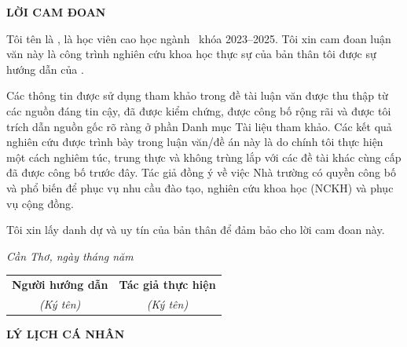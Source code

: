 
\newpage

\begin{center}
		\vspace*{50pt} %
	{\fontsize{14}{0pt}\selectfont\bf LỜI CAM ĐOAN}
\end{center}
\vspace{20pt}

Tôi tên là \student, là học viên cao học ngành \major\, khóa 2023--2025. Tôi xin cam đoan luận văn này là công trình
nghiên cứu khoa học thực sự của bản thân tôi được sự hướng dẫn của \MainAdvisor.

Các thông tin được sử dụng tham khảo trong đề tài luận văn được thu thập từ các nguồn đáng tin cậy, đã được kiểm chứng, được công bố rộng rãi và được tôi trích dẫn nguồn	gốc rõ ràng ở phần Danh mục Tài liệu tham khảo. Các kết quả nghiên cứu được trình bày trong luận văn/đề án này là do chính tôi thực hiện một cách nghiêm túc, trung thực và không trùng lắp với các đề tài khác cùng cấp đã được công bố trước đây. Tác giả đồng ý về việc Nhà trường có quyền công bố và phổ biến để phục vụ nhu cầu đào tạo, nghiên cứu khoa học (NCKH) và phục vụ cộng đồng.


Tôi xin lấy danh dự và uy tín của bản thân để đảm bảo cho lời cam đoan này.

\vspace{40pt}
\begin{flushright}\it 
	Cần Thơ, ngày \quad tháng \quad năm \qquad\,\\
\end{flushright}
\begin{center}
	\begin{tabular*}{.8\columnwidth}{@{\extracolsep\fill}cc@{\extracolsep\fill}} 
		\textbf{Người hướng dẫn} & \textbf{Tác giả thực hiện}\\
		\textit{(Ký tên)} & \textit{(Ký tên)}\\
		
	\end{tabular*}
\end{center}





\newpage
	\vspace*{50pt} %
\begin{center}
	{\fontsize{14}{0pt}\selectfont\bf LÝ LỊCH CÁ NHÂN}
\end{center}
\vspace{20pt}

